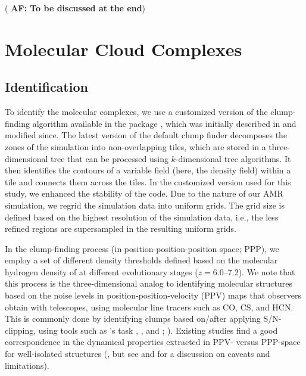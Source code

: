 \IfFileExists{emulateapjlegacy.cls}{\documentclass[iop]{emulateapjlegacy}}{\documentclass[iop]{emulateapj}}
\newcommand{\AF}[1]{({\bf \color{afcolor} AF: #1})}
\begin{document}
\AF{To be discussed at the end}

\section{Molecular Cloud Complexes}\label{sec:eqn}

\subsection{Identification}\label{sec:method}

To identify the molecular complexes, we use a customized version of the clump-finding algorithm available in the  package  \citep{Turk11a}, which was initially described in \citet{Smith09a} and modified since.
%
The latest version of the default  clump finder decomposes the zones of the simulation into non-overlapping tiles, which are stored in a three-dimensional tree that can be processed using $k$-dimensional tree algorithms. It then identifies the contours of a variable field (here, the density field) within a tile and connects them across the tiles. In the customized version used for this study, we enhanced the stability of the code.
%
Due to the nature of our AMR simulation, we regrid the simulation data into uniform grids. The grid size is defined based on the highest resolution of the simulation data, i.e., the less refined regions are supersampled in the resulting uniform grids.

In the clump-finding process (in position-position-position space; PPP), we employ a set of different density thresholds defined based on the molecular hydrogen density of \flower at different evolutionary stages ($z=6.0$--7.2).
%
We note that this process is the three-dimensional analog to identifying molecular structures based on the noise levels in position-position-velocity (PPV) maps that observers obtain with telescopes, using molecular line tracers such as CO, CS, and HCN. This is commonly done by 
identifying clumps based on/after applying S/N-clipping, using tools such as 's task , , and ; \citealt{Williams94a, Oka01a, Rosolowsky06a, Rosolowsky08a}).
%
Existing studies find a good correspondence in the dynamical properties extracted in PPV- versus PPP-space for well-isolated structures (\citealt{Ballesteros-Paredes02a, Heitsch09a, Shetty10a, Beaumont13a, Pan15a}, but see \citealt{Ballesteros-Paredes02a} and \citealt{Shetty10a} for a discussion on caveats and limitations).
\end{document}
